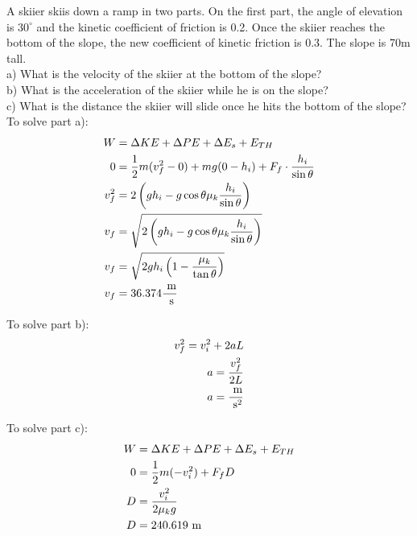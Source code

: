 \begin{problem}
    A skiier skiis down a ramp in two parts. On the first part, the angle of elevation is $30^\circ$ and the kinetic coefficient of friction is 0.2. Once the skiier reaches the bottom of the slope, the new coefficient of kinetic friction is 0.3. The slope is 70m tall.\\

    a) What is the velocity of the skiier at the bottom of the slope?\\

    b) What is the acceleration of the skiier while he is on the slope?\\

    c) What is the distance the skiier will slide once he hits the bottom of the slope?\\

    To solve part a):
    $$
    \begin{aligned}
        W &= \Delta KE + \Delta PE + \Delta E_s + E_{TH}\\
        0 &= \frac{1}{2}m(v_f^2-0) + mg(0-h_i) + F_f\cdot\frac{h_i}{\sin\theta}\\
        v_f^2 &= 2\left(gh_i - g\cos\theta\mu_k\frac{h_i}{\sin\theta}\right)\\
        v_f &= \sqrt{2\left(gh_i - g\cos\theta\mu_k\frac{h_i}{\sin\theta}\right)}\\
        v_f &= \sqrt{2gh_i\left(1 - \frac{\mu_k}{\tan\theta}\right)}\\
        v_f &= 36.374 \frac{\text{ m}}{\text{ s}}
    \end{aligned}
    $$

    To solve part b):
    $$
    \begin{aligned}
        v_f^2 = v_i^2 + 2aL\\
        a = \frac{v_f^2}{2L}\\
        a = \frac{\text{ m}}{\text{ s}^2}
    \end{aligned}
    $$

    To solve part c):
    $$
    \begin{aligned}
        W &= \Delta KE + \Delta PE + \Delta E_s + E_{TH}\\
        0 &= \frac{1}{2}m(-v_i^2)+F_fD\\
        D &= \frac{v_i^2}{2\mu_kg}\\
        D &= 240.619\text{ m}
    \end{aligned}
    $$
\end{problem}


